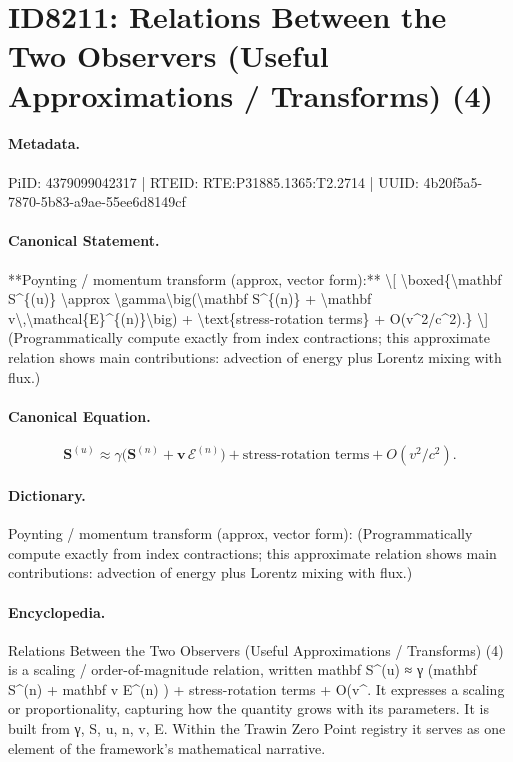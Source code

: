 \section*{ID8211: Relations Between the Two Observers (Useful Approximations / Transforms) (4)}
\paragraph{Metadata.}
PiID: 4379099042317 | RTEID: RTE:P31885.1365:T2.2714 | UUID: 4b20f5a5-7870-5b83-a9ae-55ee6d8149cf

\paragraph{Canonical Statement.}
**Poynting / momentum transform (approx, vector form):** \textbackslash{}[ \textbackslash{}boxed\{\textbackslash{}mathbf S\textasciicircum{}\{(u)\} \textbackslash{}approx \textbackslash{}gamma\textbackslash{}big(\textbackslash{}mathbf S\textasciicircum{}\{(n)\} + \textbackslash{}mathbf v\textbackslash{},\textbackslash{}mathcal\{E\}\textasciicircum{}\{(n)\}\textbackslash{}big) + \textbackslash{}text\{stress-rotation terms\} + O(v\textasciicircum{}2/c\textasciicircum{}2).\} \textbackslash{}] (Programmatically compute exactly from index contractions; this approximate relation shows main contributions: advection of energy plus Lorentz mixing with flux.)

\paragraph{Canonical Equation.}
\[
\boxed{\mathbf S^{(u)} \approx \gamma\big(\mathbf S^{(n)} + \mathbf v\,\mathcal{E}^{(n)}\big) + \text{stress-rotation terms} + O(v^2/c^2).}
\]

\paragraph{Dictionary.}
Poynting / momentum transform (approx, vector form): (Programmatically compute exactly from index contractions; this approximate relation shows main contributions: advection of energy plus Lorentz mixing with flux.)

\paragraph{Encyclopedia.}
Relations Between the Two Observers (Useful Approximations / Transforms) (4) is a scaling / order-of-magnitude relation, written mathbf S\textasciicircum{}(u) ≈ γ (mathbf S\textasciicircum{}(n) + mathbf v E\textasciicircum{}(n) ) + stress-rotation terms + O(v\textasciicircum{}. It expresses a scaling or proportionality, capturing how the quantity grows with its parameters. It is built from γ, S, u, n, v, E. Within the Trawin Zero Point registry it serves as one element of the framework's mathematical narrative.
